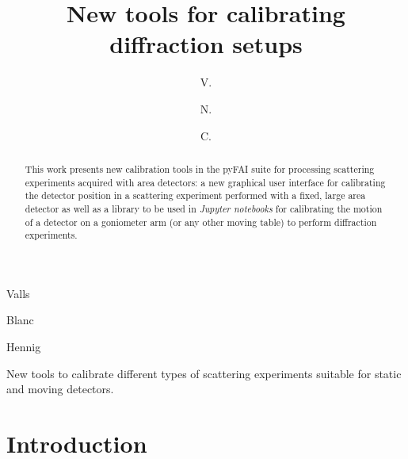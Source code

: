 \documentclass[preprint]{iucr}              %
\begin{document}

\title{New tools for calibrating diffraction setups}
 

 \author[a]{V.}{Valls}
 \author[b,c]{N.}{Blanc}
 \author[d,e]{C.}{Hennig}
 





\maketitle                        %

\begin{synopsis}
New tools to calibrate different types of scattering experiments suitable for static
and moving detectors.
\end{synopsis}

\begin{abstract}


This work presents new calibration tools in the pyFAI
suite for processing scattering experiments acquired with area detectors:
a new graphical user interface for calibrating the detector position in a  
scattering experiment performed with a fixed, large area detector as well as 
a library to be used in \textit{Jupyter notebooks} for calibrating the motion
of a detector on a goniometer arm (or any other moving table) to perform
diffraction experiments.
\end{abstract}


\section{Introduction}
\end{document}
